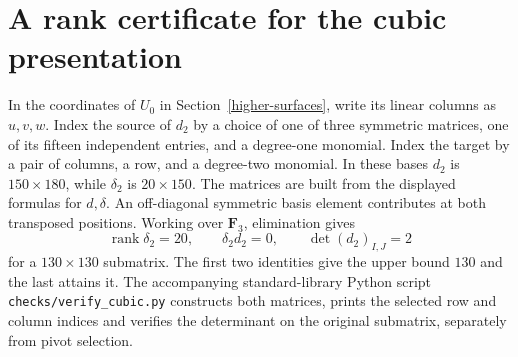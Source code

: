 \section{A rank certificate for the cubic presentation}\label{cubcert}
In the coordinates of $U_0$ in Section~\ref{higher-surfaces}, write its linear columns as $u,v,w$. Index the source of $d_2$ by a choice of one of three symmetric matrices, one of its fifteen independent entries, and a degree-one monomial. Index the target by a pair of columns, a row, and a degree-two monomial. In these bases $d_2$ is $150\times180$, while $\delta_2$ is $20\times150$. The matrices are built from the displayed formulas for $d,\delta$. An off-diagonal symmetric basis element contributes at both transposed positions. Working over $\mathbf F_3$, elimination gives
\[
 \operatorname{rank}\delta_2=20,\qquad \delta_2d_2=0,\qquad
 \det (d_2)_{I,J}=2
\]
for a $130\times130$ submatrix. The first two identities give the upper bound $130$ and the last attains it. The accompanying standard-library Python script \texttt{checks/verify\_cubic.py} constructs both matrices, prints the selected row and column indices and verifies the determinant on the original submatrix, separately from pivot selection.

